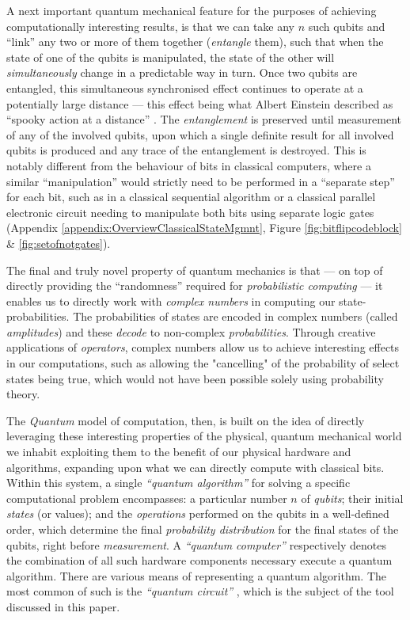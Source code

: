 \documentclass[conference]{IEEEtran}
\begin{document}
A next important quantum mechanical feature for the purposes of achieving computationally interesting results,
is that we can take any $n$ such qubits and ``link'' any two or more of them together
(\textit{entangle} them), such that when the state of one of the qubits is manipulated,
the state of the other will \textit{simultaneously} change in a predictable way
in turn.
Once two qubits are entangled, this simultaneous synchronised effect continues to
operate at a potentially large distance — this effect being what Albert Einstein described as ``spooky action at a distance'' \cite{ref:nobel2022phys}.
The \textit{entanglement} is preserved until measurement of any of the involved qubits, upon which a single definite result for all involved qubits
is produced and any trace of the entanglement is destroyed. This is notably different from the behaviour of bits in classical computers,
where a similar ``manipulation'' would strictly need to be performed in a ``separate step'' for each bit,
such as in a classical sequential algorithm or a classical parallel electronic circuit needing to manipulate both bits
using separate logic gates (Appendix \ref{appendix:OverviewClassicalStateMgmnt}, Figure \ref{fig:bitflipcodeblock} \& \ref{fig:setofnotgates}).

The final and truly novel property of quantum mechanics is that —
on top of directly providing the ``randomness'' required for \textit{probabilistic computing} —
it enables us to directly work with \textit{complex numbers} in computing our state-probabilities.
The probabilities of states are encoded in complex numbers (called \textit{amplitudes}) and these \textit{decode} to non-complex \textit{probabilities}.
Through creative applications of \textit{operators}, complex numbers allow us to achieve interesting
effects in our computations, such as allowing the "cancelling" of the probability of select states being true,
which would not have been possible solely using probability theory\cite{ref:quantumcomputingsincedemocritus}.


The \textit{Quantum} model of computation, then, is built on the idea of directly leveraging these interesting properties of the physical, quantum mechanical world
we inhabit exploiting them to the benefit of our physical hardware and algorithms,
expanding upon what we can directly compute with classical bits.
Within this system, a single \textit{``quantum algorithm''} for solving a specific computational problem encompasses: a particular number $n$ of \textit{qubits};
their initial \textit{states} (or values); and the \textit{operations} performed on the qubits in a well-defined order,
which determine the final
\textit{probability distribution} for the final states of the qubits, right before \textit{measurement}. A \textit{``quantum computer''}
respectively denotes the combination of all such hardware components necessary execute a quantum algorithm.
There are various means of representing a quantum algorithm. The most common of such is the \textit{``quantum circuit''}
\cite{ref:ibmqiskitdocs,ref:microsoftquantumdocs,ref:googlecirqdocs}, which is the subject of the tool discussed in this paper.
\end{document}
